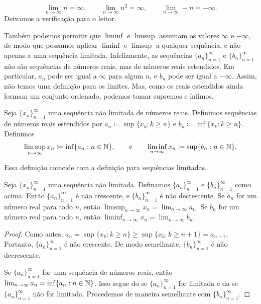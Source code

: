 \begin{example}
\begin{equation*}
\lim_{n\to \infty} n = \infty,
\qquad
\lim_{n\to \infty} n^2 = \infty,
\qquad
\lim_{n\to \infty} -n = -\infty.
\end{equation*}
Deixamos a verificação para o leitor.
\end{example}

Também podemos permitir que $\liminf$ e $\limsup$ assumam
os valores $\infty$ e $-\infty$, de modo que
possamos aplicar $\liminf$ e $\limsup$ a qualquer sequência, e não apenas
a uma sequência limitada. Infelizmente, as sequências $\{ a_n \}_{n=1}^\infty$ e
$\{ b_n \}_{n=1}^\infty$
não são sequências de números reais, mas de números reais estendidos. Em
particular, $a_n$ pode ser igual a $\infty$ para algum $n$, e $b_n$ pode ser igual a
$-\infty$. Assim, não temos uma definição para os limites.
Mas, como os reais estendidos ainda formam um conjunto ordenado, podemos
tomar supremos e ínfimos.

\begin{defn}
Seja $\{ x_n \}_{n=1}^\infty$ uma sequência não limitada de números reais. Definimos
sequências de números reais estendidos por
$a_n \coloneqq \sup \{ x_k : k \geq n \}$ e
$b_n \coloneqq \inf \{ x_k : k \geq n \}$.
Definimos
\begin{equation*}
\limsup_{n \to \infty} x_n \coloneqq \inf \{ a_n : n \in {\mathbb{N}} \}, \qquad \text{e} \qquad
\liminf_{n \to \infty} x_n \coloneqq \sup \{ b_n : n \in {\mathbb{N}} \}.
\end{equation*}
\end{defn}

Essa definição coincide com a definição para sequências limitadas.

\begin{prop}
Seja $\{ x_n \}_{n=1}^\infty$ uma sequência não limitada. Definamos
$\{ a_n \}_{n=1}^\infty$ e $\{ b_n \}_{n=1}^\infty$ como acima.
Então $\{ a_n \}_{n=1}^\infty$ é não crescente, e $\{ b_n \}_{n=1}^\infty$ é não decrescente.
Se $a_n$ for um número real para todo $n$, então
$\limsup_{n\to\infty} x_n = \lim_{n\to\infty} a_n$.
Se $b_n$ for um número real para todo $n$, então
$\liminf_{n\to\infty} x_n = \lim_{n\to\infty} b_n$.
\end{prop}

\begin{proof}
Como antes,
$a_n = \sup \{ x_k : k \geq n \} \geq \sup \{ x_k : k \geq n+1 \} =
a_{n+1}$. Portanto, $\{ a_n \}_{n=1}^\infty$ é não crescente. De modo semelhante,
$\{ b_n \}_{n=1}^\infty$ é não decrescente.

Se $\{ a_n \}_{n=1}^\infty$ for uma sequência de números reais, então
$\lim_{n\to\infty} a_n = \inf \{ a_n : n \in {\mathbb{N}} \}$. Isso segue do
 se $\{ a_n \}_{n=1}^\infty$ for limitada e da
 se $\{a_n \}_{n=1}^\infty$
não for limitada. Procedemos de maneira semelhante com $\{ b_n \}_{n=1}^\infty$.
\end{proof}

